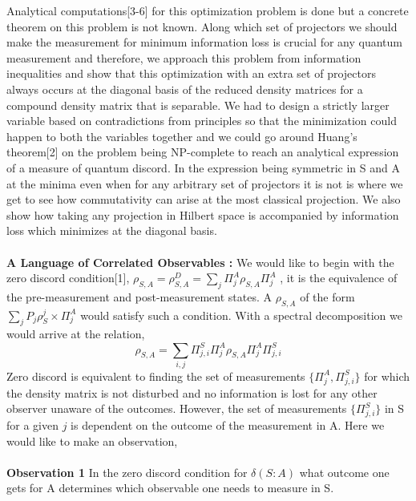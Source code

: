 \documentclass[8pt]{article}
\begin{document}
Analytical computations[3-6] for this optimization problem is done but a concrete theorem on this problem is not known. Along which set of projectors we should make the measurement for minimum information loss is crucial for any quantum measurement and therefore, we approach this problem from information inequalities and show that this optimization with an extra set of projectors always occurs at the diagonal basis of the reduced density matrices for a compound density matrix that is separable. We had to design a strictly larger variable based on contradictions from principles so that the minimization could happen to both the variables together and we could go around Huang's theorem[2] on the problem being NP-complete to reach an analytical expression of a measure of quantum discord. In the expression being symmetric in S and A at the minima even when for any arbitrary set of projectors it is not is where we get to see how commutativity can arise at the most classical projection. We also show how taking any projection in Hilbert space is accompanied by information loss which minimizes at the diagonal basis.\\
\\
\textbf{A Language of Correlated Observables :} We would like to begin with the zero discord condition[1], $\rho_{\scriptscriptstyle{S,A}} = \rho_{\scriptscriptstyle{S,A}}^{\scriptscriptstyle{D}} = \sum_{j}\Pi^{\scriptscriptstyle{A}}_{j}\rho_{\scriptscriptstyle{S,A}}\Pi^{\scriptscriptstyle{A}}_{j}$  , it is the equivalence of the pre-measurement and post-measurement states. A $\rho_{\scriptscriptstyle{S,A}}$ of the form $\sum_{j}P_{j}\rho^{j}_{\scriptscriptstyle{S}}\times \Pi^{\scriptscriptstyle{A}}_{j}$ would satisfy such a condition. With a spectral decomposition we would arrive at the relation,
\[ \rho_{\scriptscriptstyle{S,A}} = \sum_{i,j}\Pi^{\scriptscriptstyle{S}}_{j,i}\Pi^{\scriptscriptstyle{A}}_{j} \rho_{\scriptscriptstyle{S,A}} \Pi^{\scriptscriptstyle{A}}_{j}\Pi^{\scriptscriptstyle{S}}_{j,i}\]
Zero discord is equivalent to finding the set of measurements $\{\Pi^{\scriptscriptstyle{A}}_{j}, \Pi^{\scriptscriptstyle{S}}_{j,i}\}$ for which the density matrix is not disturbed and no information is lost for any other observer unaware of the outcomes. However, the set of measurements $\{\Pi^{\scriptscriptstyle{S}}_{j,i}\}$ in S for a given $j$ is dependent on the outcome of the measurement in A. Here we would like to make an observation,\\
\\
\textbf{Observation 1} In the zero discord condition for $\delta(S:A)$ what outcome one gets for A determines which observable one needs to measure in S.\\
\end{document}
